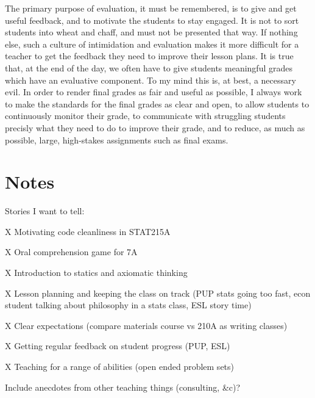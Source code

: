 \documentclass{article}
\begin{document}
The primary purpose of evaluation, it must be remembered, is to give and get
useful feedback, and to motivate the students to stay engaged.  It is not to
sort students into wheat and chaff, and must not be presented that way.  If
nothing else, such a culture of intimidation and evaluation makes it more
difficult for a teacher to get the feedback they need to improve their lesson
plans.  It is true that, at the end of the day, we often have to give students
meaningful grades which have an evaluative component.  To my mind this is, at
best, a necessary evil.  In order to render final grades as fair and useful as
possible, I always work to make the standards for the final grades as clear and
open, to allow students to continuously monitor their grade, to communicate with
struggling students precisly what they need to do to improve their grade, and to
reduce, as much as possible, large, high-stakes assignments such as final exams.







\section{Notes}


Stories I want to tell:

X Motivating code cleanliness in STAT215A

X Oral comprehension game for 7A

X Introduction to statics and axiomatic thinking

X Lesson planning and keeping the class on track (PUP stats going too fast,
econ student talking about philosophy in a stats class, ESL story time)

X Clear expectations (compare materials course vs 210A as writing classes)

X Getting regular feedback on student progress (PUP, ESL)

X Teaching for a range of abilities (open ended problem sets)

Include anecdotes from other teaching things (consulting, \&c)?
\end{document}
